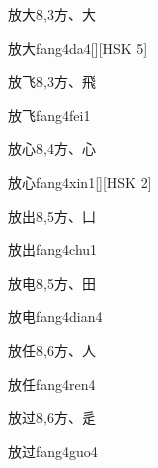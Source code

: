 \begin{Entry}{放大}{8,3}{⽅、⼤}
  \begin{Phonetics}{放大}{fang4da4}[][HSK 5]
  \end{Phonetics}
\end{Entry}

\begin{Entry}{放飞}{8,3}{⽅、⾶}
  \begin{Phonetics}{放飞}{fang4fei1}
  \end{Phonetics}
\end{Entry}

\begin{Entry}{放心}{8,4}{⽅、⼼}
  \begin{Phonetics}{放心}{fang4xin1}[][HSK 2]
  \end{Phonetics}
\end{Entry}

\begin{Entry}{放出}{8,5}{⽅、⼐}
  \begin{Phonetics}{放出}{fang4chu1}
  \end{Phonetics}
\end{Entry}

\begin{Entry}{放电}{8,5}{⽅、⽥}
  \begin{Phonetics}{放电}{fang4dian4}
  \end{Phonetics}
\end{Entry}

\begin{Entry}{放任}{8,6}{⽅、⼈}
  \begin{Phonetics}{放任}{fang4ren4}
  \end{Phonetics}
\end{Entry}

\begin{Entry}{放过}{8,6}{⽅、⾡}
  \begin{Phonetics}{放过}{fang4guo4}
  \end{Phonetics}
\end{Entry}

